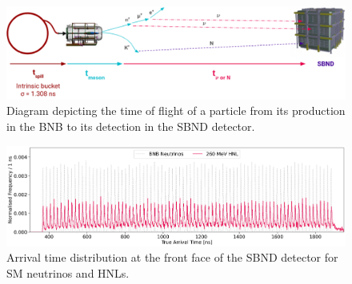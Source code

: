 \begin{figure}[hb!] 
\centering    
\includegraphics[width=1.0\textwidth]{tof_beam_to_detector}
\caption[Time of Flight of Particles From the BNB to SBND Diagram]{
Diagram depicting the time of flight of a particle from its production in the BNB to its detection in the SBND detector.
}
\label{fig:tof_beam_to_detector}
\end{figure}

\begin{figure}[b!] 
\centering    
\includegraphics[width=1.0\textwidth]{full_beam}
\caption[Arrival Time of SM Neutrinos and HNLs at the Front Face of SBND]{
Arrival time distribution at the front face of the SBND detector for SM neutrinos and HNLs. 
}
\label{fig:full_beam}
\end{figure}

